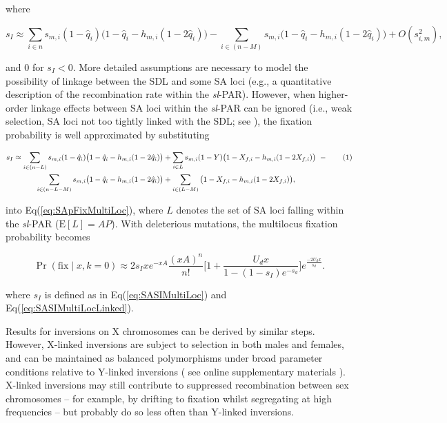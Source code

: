 \documentclass{article}
\newcommand\hl[1]{%
  \bgroup
  \hskip0pt\color{blue!80!black}%
  #1%
  \egroup
}
\newcommand\numberthis{\addtocounter{equation}{1}\tag{\theequation}}
\begin{document}
\noindent where

\begin{equation}\label{eq:SASIMultiLoc}
	s_I \approx \sum_{i \in n} s_{m,i} (1 - \hat{q}_{i}) \big( 1 - \hat{q}_i - h_{m,i} (1 - 2 \hat{q}_i) \big) - \sum_{i \in (n-M)} s_{m,i} \big( 1 - \hat{q}_i - h_{m,i} (1 - 2 \hat{q}_i) \big) + O(s_{i,m}^2),
\end{equation}

\noindent and $0$ for $s_I < 0$. More detailed assumptions are necessary to model the possibility of linkage between the SDL and some SA loci (e.g., a quantitative description of the recombination rate within the {\itshape sl}-PAR). However, when higher-order linkage effects between SA loci within the {\itshape sl}-PAR can be ignored (i.e., weak selection, SA loci not too tightly linked with the SDL; see \citealt{Otto2019}), the fixation probability is well approximated by substituting 

\begin{align*}\label{eq:SASIMultiLocLinked}
		s_I \approx \sum_{i \in (n - L)} s_{m,i} (1 - \hat{q}_{i}) \big( 1 - \hat{q}_i - h_{m,i} (1 - 2 \hat{q}_i) \big) &+ \sum_{i \in L} s_{m,i}(1 - Y) \big( 1 - X_{f,i} - h_{m,i}(1 - 2 X_{f,i}) \big)~- \numberthis\\
		\sum_{i \in (n-L-M)} s_{m,i} \big( 1 - \hat{q}_i - h_{m,i} (1 - 2 \hat{q}_i) \big) &+ \sum_{i \in (L-M)} \big( 1 - X_{f,i} - h_{m,i}(1 - 2 X_{f,i}) \big),
\end{align*}

\noindent into Eq(\ref{eq:SApFixMultiLoc}), where $L$ denotes the set of SA loci falling within the {\itshape sl}-PAR ($\text{E} [L] = AP$). With deleterious mutations, the multilocus fixation probability becomes

\begin{equation} \label{eq:SApFixMultiLocDelMut}
	\Pr(\text{fix} \mid x, k = 0) \approx 2 s_I x e^{-xA} \frac{(xA)^n}{n!} \Bigg[ 1+ \frac{U_d x}{1 - (1-s_I)e^{-s_d}} \Bigg] e^{\frac{-2U_d x}{s_d}}.
\end{equation}

\noindent where $s_I$ is defined as in Eq(\ref{eq:SASIMultiLoc}) and Eq(\ref{eq:SASIMultiLocLinked}).

Results for inversions on X chromosomes can be derived by similar steps. However, X-linked inversions are subject to selection in both males and females, and can be maintained as balanced polymorphisms under broad parameter conditions relative to Y-linked inversions (\hl{see online supplementary materials}). X-linked inversions may still contribute to suppressed recombination between sex chromosomes -- for example, by drifting to fixation whilst segregating at high frequencies -- but probably do so less often than Y-linked inversions.
\end{document}
